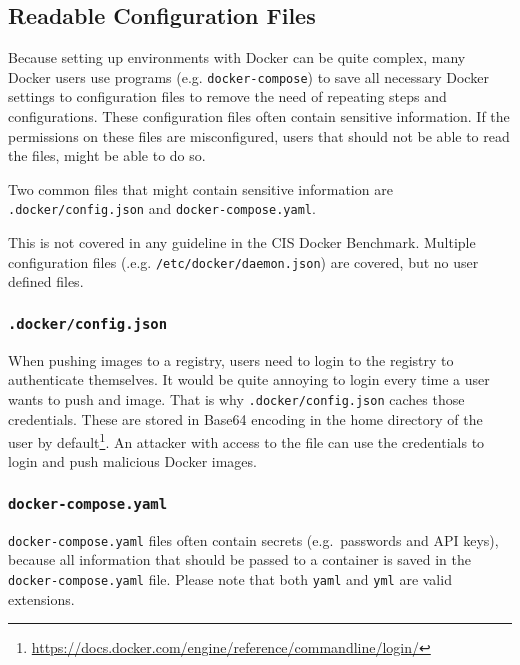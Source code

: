 \subsection{Readable Configuration Files}\label{subsection:config-files}
Because setting up environments with Docker can be quite complex, many Docker users use programs (e.g. \lstinline{docker-compose}) to save all necessary Docker settings to configuration files to remove the need of repeating steps and configurations. These configuration files often contain sensitive information. If the permissions on these files are misconfigured, users that should not be able to read the files, might be able to do so.

Two common files that might contain sensitive information are \lstinline{.docker/config.json} and \lstinline{docker-compose.yaml}.

\medskip

This is not covered in any guideline in the CIS Docker Benchmark. Multiple configuration files (.e.g. \lstinline{/etc/docker/daemon.json}) are covered, but no user defined files.

\subsubsection{\texorpdfstring{\lstinline{.docker/config.json}}{.docker/config.json}}\label{config-files:docker-config-json}
When pushing images to a registry, users need to login to the registry to authenticate themselves.
It would be quite annoying to login every time a user wants to push and image. That is why \lstinline{.docker/config.json} caches those credentials. These are stored in Base64 encoding in the home directory of the user by default\footnote{\url{https://docs.docker.com/engine/reference/commandline/login/}}. An attacker with access to the file can use the credentials to login and push malicious Docker images\cite{Docker-Credentials-Metasploit}.

\subsubsection{\texorpdfstring{\lstinline{docker-compose.yaml}}{docker-compose.yaml}}
\lstinline{docker-compose.yaml} files often contain secrets (e.g.\ passwords and API keys), because all information that should be passed to a container is saved in the \lstinline{docker-compose.yaml} file. Please note that both \lstinline{yaml} and \lstinline{yml} are valid extensions.
